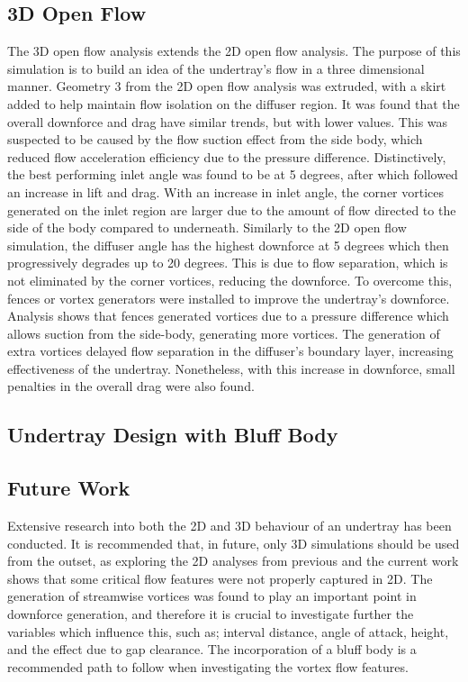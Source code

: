 \subsection*{3D Open Flow}
The 3D open flow analysis extends the 2D open flow analysis. The purpose of this simulation is to build an idea of the undertray's flow in a three dimensional manner. Geometry 3 from the 2D open flow analysis was extruded, with a skirt added to help maintain flow isolation on the diffuser region. It was found that the overall downforce and drag have similar trends, but with lower values. This was suspected to be caused by the flow suction effect from the side body, which reduced flow acceleration efficiency due to the pressure difference. Distinctively, the best performing inlet angle was found to be at 5 degrees, after which followed an increase in lift and drag. With an increase in inlet angle, the corner vortices generated on the inlet region are larger due to the amount of flow directed to the side of the body compared to underneath. Similarly to the 2D open flow simulation, the diffuser angle has the highest downforce at 5 degrees which then progressively degrades up to 20 degrees. This is due to flow separation, which is not eliminated by the corner vortices, reducing the downforce. To overcome this, fences or vortex generators were installed to improve the undertray's downforce. Analysis shows that fences generated vortices due to a pressure difference which allows suction from the side-body, generating more vortices. The generation of extra vortices delayed flow separation in the diffuser's boundary layer, increasing effectiveness of the undertray. Nonetheless, with this increase in downforce, small penalties in the overall drag were also found.

\subsection*{Undertray Design with Bluff Body}


\subsection{Future Work}
\noindent Extensive research into both the 2D and 3D behaviour of an undertray has been conducted. It is recommended that, in future, only 3D simulations should be used from the outset, as exploring the 2D analyses from previous and the current work shows that some critical flow features were not properly captured in 2D. The generation of streamwise vortices was found to play an important point in downforce generation, and therefore it is crucial to investigate further the variables which influence this, such as; interval distance, angle of attack, height, and the effect due to gap clearance. The incorporation of a bluff body is a recommended path to follow when investigating the vortex flow features.


